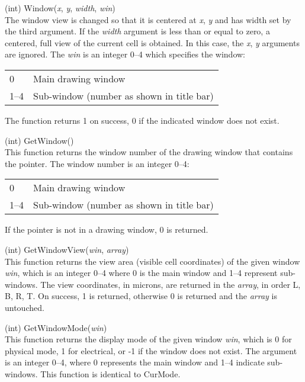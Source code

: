\begin{description}
\item{(int) \vt Window({\it x\/}, {\it y\/}, {\it width\/}, {\it win\/})}\\
The window view is changed so that it is centered at {\it x\/}, {\it
y} and has width set by the third argument.  If the {\it width\/}
argument is less than or equal to zero, a centered, full view of the
current cell is obtained.  In this case, the {\it x\/}, {\it y\/}
arguments are ignored.  The {\it win} is an integer 0--4 which
specifies the window:

\begin{tabular}{ll}
0 & Main drawing window\\
1--4 & Sub-window (number as shown in title bar)
\end{tabular}

The function returns 1 on success, 0 if the indicated window does
not exist.

\item{(int) \vt GetWindow()}\\
This function returns the window number of the drawing window
that contains the pointer.  The window number is an integer 0--4:

\begin{tabular}{ll}
0 & Main drawing window\\
1--4 & Sub-window (number as shown in title bar)
\end{tabular}

If the pointer is not in a drawing window, 0 is returned.

\item{(int) \vt GetWindowView({\it win}, {\it array\/})}\\
This function returns the view area (visible cell coordinates) of the
given window {\it win}, which is an integer 0--4 where 0 is the main
window and 1--4 represent sub-windows.  The view coordinates, in
microns, are returned in the {\it array}, in order L, B, R, T.  On
success, 1 is returned, otherwise 0 is returned and the {\it array} is
untouched.

\item{(int) \vt GetWindowMode({\it win})}\\
This function returns the display mode of the given window {\it win},
which is 0 for physical mode, 1 for electrical, or -1 if the window
does not exist.  The argument is an integer 0--4, where 0 represents
the main window and 1--4 indicate sub-windows.  This function is
identical to {\vt CurMode}.


\end{description}
